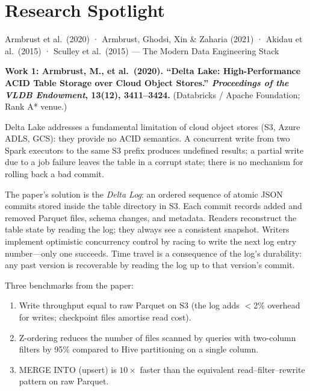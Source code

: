 \section{Research Spotlight}
\label{sec:ch11-research}

\begin{researchspotlight}{Armbrust et al.\ (2020) · Armbrust, Ghodsi, Xin
  \& Zaharia (2021) · Akidau et al.\ (2015) · Sculley et al.\ (2015) ---
  The Modern Data Engineering Stack}

\textbf{Work 1: Armbrust, M., et al.\ (2020). ``Delta Lake: High-Performance
ACID Table Storage over Cloud Object Stores.'' \textit{Proceedings of the
VLDB Endowment}, 13(12), 3411--3424.} (Databricks / Apache Foundation;
Rank A* venue.)

Delta Lake addresses a fundamental limitation of cloud object stores
(S3, Azure ADLS, GCS): they provide no ACID semantics. A concurrent
write from two Spark executors to the same S3 prefix produces undefined
results; a partial write due to a job failure leaves the table in a
corrupt state; there is no mechanism for rolling back a bad commit.

The paper's solution is the \emph{Delta Log}: an ordered sequence of
atomic JSON commits stored inside the table directory in S3. Each commit
records added and removed Parquet files, schema changes, and metadata.
Readers reconstruct the table state by reading the log; they always see
a consistent snapshot. Writers implement optimistic concurrency control
by racing to write the next log entry number---only one succeeds.
Time travel is a consequence of the log's durability: any past version
is recoverable by reading the log up to that version's commit.

Three benchmarks from the paper:
\begin{enumerate}
  \item Write throughput equal to raw Parquet on S3 (the log adds $<$2\%
        overhead for writes; checkpoint files amortise read cost).
  \item Z-ordering reduces the number of files scanned by queries with
        two-column filters by 95\% compared to Hive partitioning on
        a single column.
  \item MERGE INTO (upsert) is $10\times$ faster than the equivalent
        read--filter--rewrite pattern on raw Parquet.
\end{enumerate}


\end{researchspotlight}
